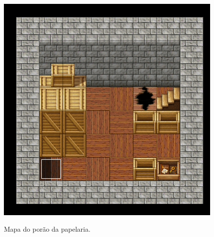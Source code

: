 \begin{figure}[!htbp]
	\centering
	\caption{Mapa do porão da papelaria.}
	\includegraphics[scale=0.5]{Textuais/Pictures/Porao_papelaria.png}
	\label{fig:porao-papelaria}
\end{figure}

